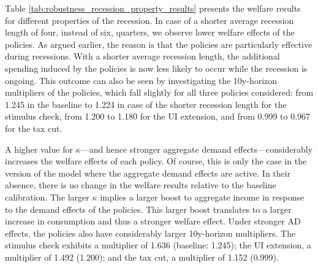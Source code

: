 \documentclass[\PathToRoot/\ProjectName]{subfiles}
\begin{document}
Table \ref{tab:robustness_recession_property_results} presents the welfare results for different properties of the recession.
In case of a shorter average recession length of four, instead of six, quarters, we observe lower welfare effects of the policies.
As argued earlier, the reason is that the policies are particularly effective during recessions.
With a shorter average recession length, the additional spending induced by the policies is now less likely to occur while the recession is ongoing.
This outcome can also be seen by investigating the 10y-horizon multipliers of the policies, which fall slightly for all three policies considered: from 1.245 in the baseline to 1.224 in case of the shorter recession length for the stimulus check, from 1.200 to 1.180 for the UI extension, and from 0.999 to 0.967 for the tax cut.

A higher value for $\kappa$---and hence stronger aggregate demand effects---considerably increases the welfare effects of each policy.
Of course, this is only the case in the version of the model where the aggregate demand effects are active.
In their absence, there is no change in the welfare results relative to the baseline calibration.
The larger $\kappa$ implies a larger boost to aggregate income in response to the demand effects of the policies.
This larger boost translates to a larger increase in consumption and thus a stronger welfare effect.
Under stronger AD effects, the policies also have considerably larger 10y-horizon multipliers.
The stimulus check exhibits a multiplier of 1.636 (baseline: 1.245); the UI extension, a multiplier of 1.492 (1.200); and the tax cut, a multiplier of 1.152 (0.999).
\end{document}
